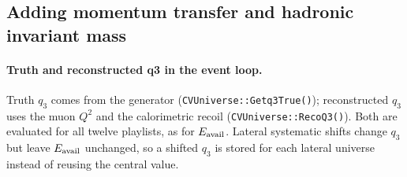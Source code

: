 \subsection{Adding momentum transfer and hadronic invariant mass}\label{recsec:higherdim-q3w}

\paragraph{Truth and reconstructed q3 in the event loop.} Truth $q_{3}$ comes from the generator (\texttt{CVUniverse::Getq3True()}); reconstructed $q_{3}$ uses the muon $Q^{2}$ and the calorimetric recoil (\texttt{CVUniverse::RecoQ3()}). Both are evaluated for all twelve playlists, as for $E_{\mathrm{avail}}$. Lateral systematic shifts change $q_{3}$ but leave $E_{\mathrm{avail}}$ unchanged, so a shifted $q_{3}$ is stored for each lateral universe instead of reusing the central value.

